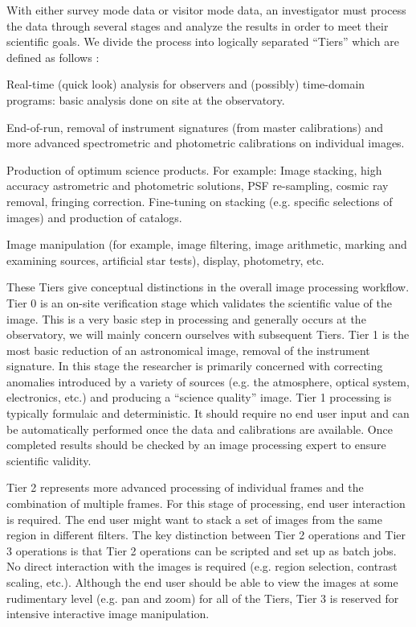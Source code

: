 \documentclass[10pt,conference]{IEEEtran}
\begin{document}
With either survey mode data or visitor mode data, an investigator must process the data through several stages and analyze the results in order to meet their scientific goals. We divide the process into logically separated ``Tiers'' which are defined as follows \cite{PASRD}:
\begin{description} 
\item[\bf Tier 0] Real-time (quick look) analysis for observers and (possibly) time-domain
programs: basic analysis done on site at the observatory. 
\item[\bf Tier 1] End-of-run, removal of instrument signatures (from master calibrations) and more
advanced spectrometric and photometric calibrations on individual images.
\item[\bf Tier 2] Production of optimum science products. For example: Image stacking, high
accuracy astrometric and photometric solutions, PSF re-sampling, cosmic ray removal,
fringing correction. Fine-tuning on stacking (e.g. specific selections of images) and
production of catalogs.
\item[\bf Tier 3] Image manipulation (for example, image filtering, image arithmetic, marking and
examining sources, artificial star tests), display, photometry, etc.
\end{description}

These Tiers give conceptual distinctions in the overall image processing workflow. Tier 0 is an on-site verification stage which validates the scientific value of the image. This is a very basic step in processing and generally occurs at the observatory, we will mainly concern ourselves with subsequent Tiers. Tier 1 is the most basic reduction of an astronomical image, removal of the instrument signature. In this stage the researcher is primarily concerned with correcting anomalies introduced by a variety of sources (e.g. the atmosphere, optical system, electronics, etc.) and producing a ``science quality'' image. Tier 1 processing is typically formulaic and deterministic. It should require no end user input and can be automatically performed once the data and calibrations are available. Once completed results should be checked by an image processing expert to ensure scientific validity.

 Tier 2 represents more advanced processing of individual frames and the combination of multiple frames. For this stage of processing, end user interaction is required. The end user might want to stack a set of images from the same region in different filters. The key distinction between Tier 2 operations and Tier 3 operations is that Tier 2 operations can be scripted and set up as batch jobs. No direct interaction with the images is required (e.g. region selection, contrast scaling, etc.). Although the end user should be able to view the images at some rudimentary level (e.g. pan and zoom) for all of the Tiers, Tier 3 is reserved for intensive interactive image manipulation.
\end{document}
